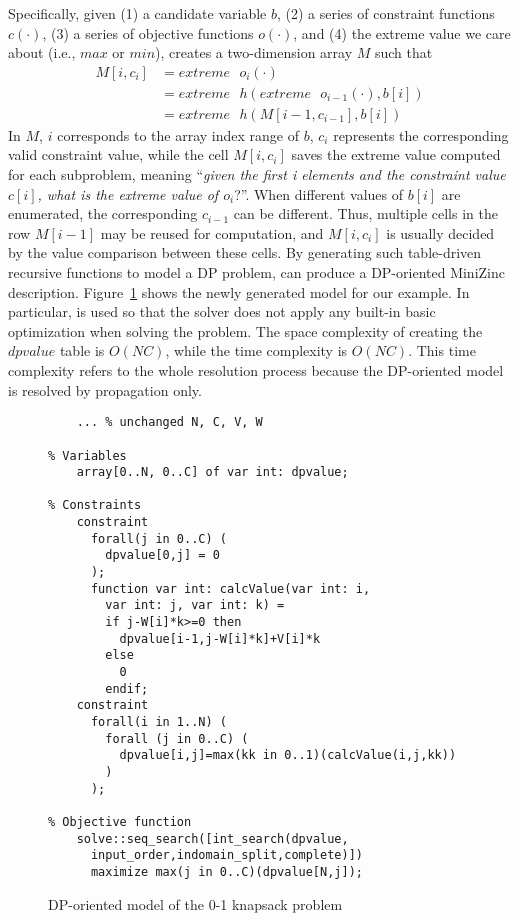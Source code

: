 Specifically, given (1) a candidate variable $b$, (2) a series of constraint functions $c(\cdot)$, (3) a series of objective functions $o(\cdot)$, and (4) the extreme value we care about (i.e., $max$ or $min$), \tool creates a two-dimension array $M$ such that 
\begin{align}
    M[i, c_i]&=extreme\text{ }o_i(\cdot) \nonumber\\
           &=extreme\text{ }h(extreme\text{ }o_{i-1}(\cdot), b[i]) \nonumber \\
           &=extreme\text{ }h(M[i-1, c_{i-1}], b[i]) \tag{3.5}
\end{align}
In $M$, $i$ corresponds to the array index range of $b$,
$c_i$ represents the corresponding valid constraint value, while the cell $M[i, c_i]$ saves the extreme value computed for each subproblem, meaning ``\emph{given the first i elements and the constraint value $c[i]$, what is the extreme value of $o_i$}?''. When different values of $b[i]$ are enumerated, the corresponding $c_{i-1}$ can be different. Thus, multiple cells in the row $M[i-1]$ may be reused for computation, and $M[i, c_i]$ is usually decided
by the value comparison between these cells. 
By generating such table-driven recursive functions to model a DP problem, \tool can produce a DP-oriented MiniZinc description. Figure~\ref{fig:knapsack2} shows the newly generated model for our example. In particular,  is used so that the solver does not apply any built-in basic optimization when solving the problem. 
The space complexity of creating the $dpvalue$ table is $O(NC)$, while the time complexity is $O(NC)$. This time complexity refers to the whole resolution process because the DP-oriented model is resolved by propagation only.

	\begin{figure}[htb]
\begin{lstlisting}[frame=single]
% Input arguments
    ... % unchanged N, C, V, W

% Variables
    array[0..N, 0..C] of var int: dpvalue;

% Constraints
    constraint
      forall(j in 0..C) (
        dpvalue[0,j] = 0
      );
      function var int: calcValue(var int: i, 
        var int: j, var int: k) =
        if j-W[i]*k>=0 then
          dpvalue[i-1,j-W[i]*k]+V[i]*k
        else
          0
        endif;
    constraint
      forall(i in 1..N) (
        forall (j in 0..C) (
          dpvalue[i,j]=max(kk in 0..1)(calcValue(i,j,kk))
        )
      );

% Objective function    
    solve::seq_search([int_search(dpvalue,
      input_order,indomain_split,complete)]) 
      maximize max(j in 0..C)(dpvalue[N,j]);
\end{lstlisting}
\caption{DP-oriented model of the 0-1 knapsack problem}\label{fig:knapsack2}
\end{figure}

